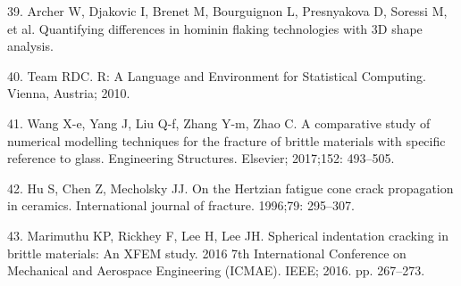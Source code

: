 \documentclass[10pt,letterpaper]{article}
\begin{document}
\leavevmode\hypertarget{ref-archer_quantifying_nodate}{}%
39. Archer W, Djakovic I, Brenet M, Bourguignon L, Presnyakova D,
Soressi M, et al. Quantifying differences in hominin flaking
technologies with 3D shape analysis.

\leavevmode\hypertarget{ref-team_r_2010}{}%
40. Team RDC. R: A Language and Environment for Statistical Computing.
Vienna, Austria; 2010.

\leavevmode\hypertarget{ref-wang_comparative_2017}{}%
41. Wang X-e, Yang J, Liu Q-f, Zhang Y-m, Zhao C. A comparative study of
numerical modelling techniques for the fracture of brittle materials
with specific reference to glass. Engineering Structures. Elsevier;
2017;152: 493--505.

\leavevmode\hypertarget{ref-hu_hertzian_1996}{}%
42. Hu S, Chen Z, Mecholsky JJ. On the Hertzian fatigue cone crack
propagation in ceramics. International journal of fracture. 1996;79:
295--307.

\leavevmode\hypertarget{ref-marimuthu_spherical_2016}{}%
43. Marimuthu KP, Rickhey F, Lee H, Lee JH. Spherical indentation
cracking in brittle materials: An XFEM study. 2016 7th International
Conference on Mechanical and Aerospace Engineering (ICMAE). IEEE; 2016.
pp. 267--273.

\nolinenumbers
\end{document}
